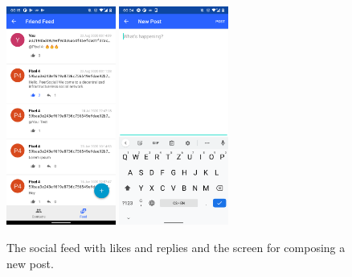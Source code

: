 \begin{figure}
    \centering
    \includegraphics[width=0.32\textwidth]{screens/superapp/feed}
    \includegraphics[width=0.32\textwidth]{screens/superapp/new_post}
    \caption{The social feed with likes and replies and the screen for composing a new post.}
    \label{peersocial_feed}
\end{figure}





